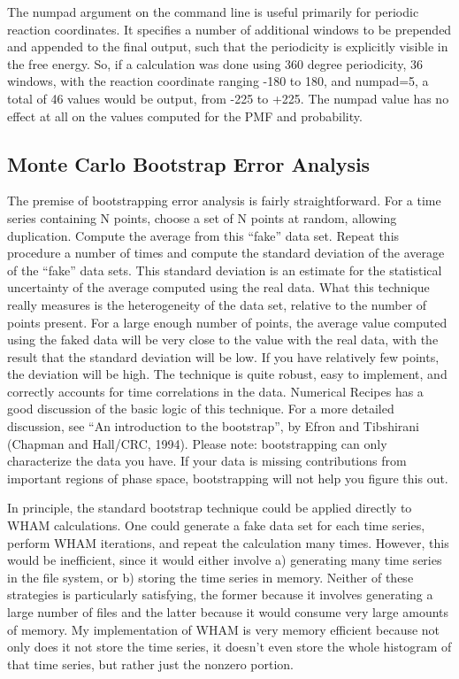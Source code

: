 \documentclass[12pt]{article}
\begin{document}
The numpad argument on the command line is useful primarily for periodic
reaction coordinates.  It specifies a number of additional windows to be
prepended and appended to the final output, such that the periodicity is
explicitly visible in the free energy.  So, if a calculation was done using
360 degree periodicity, 36 windows, with the reaction coordinate ranging
-180 to 180, and numpad=5, a total of 46 values would be output, from -225
to +225.  The numpad value has no effect at all on the values computed for
the PMF and probability.

\subsection{Monte Carlo Bootstrap Error Analysis}
\label{ss:bootstrap}

The premise of bootstrapping error analysis is fairly straightforward.  For
a time series containing N points, choose a set of N points at random,
allowing duplication.  Compute the average from this ``fake'' data set.
Repeat this procedure a number of times and compute the standard deviation
of the average of the ``fake'' data sets.  This standard deviation is an
estimate for the statistical uncertainty of the average computed using the
real data.  What this technique really measures is the heterogeneity of the
data set, relative to the number of points present.  For a large enough
number of points, the average value computed using the faked data will be
very close to the value with the real data, with the result that the
standard deviation will be low.  If you have relatively few points, the
deviation will be high.  The technique is quite robust, easy to implement,
and correctly accounts for time correlations in the data.  Numerical
Recipes has a good discussion of the basic logic of this technique.  For a
more detailed discussion, see ``An introduction to the bootstrap'', by Efron
and Tibshirani (Chapman and Hall/CRC, 1994).  Please note: bootstrapping can
only characterize the data you have.  If your data is missing contributions
from important regions of phase space, bootstrapping will not help you figure
this out.  

In principle, the standard bootstrap technique could be applied directly to
WHAM calculations.  One could generate a fake data set for each time
series, perform WHAM iterations, and repeat the calculation many times.
However, this would be inefficient, since it would either involve a)
generating many time series in the file system, or b) storing the time
series in memory.  Neither of these strategies is particularly satisfying,
the former because it involves generating a large number of files and the
latter because it would consume very large amounts of memory.  
My implementation of WHAM is very memory efficient because not only does it
not store the time series, it doesn't even store the whole histogram of
that time series, but rather just the nonzero portion.
\end{document}
